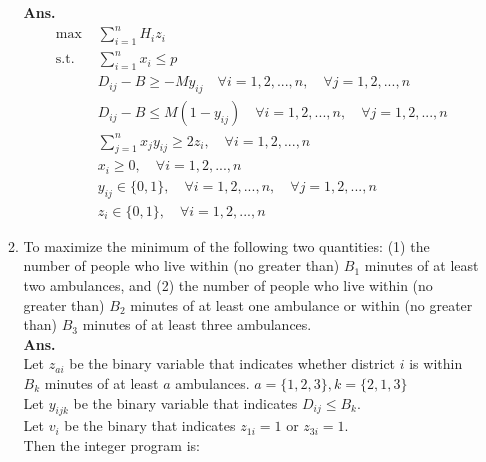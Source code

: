 \documentclass[14pt]{article}
\begin{document}
\begin{enumerate}
\begin{enumerate}
                        \textbf{Ans. }
                        \begin{align*}
                              \text{max }  & \sum_{i=1}^n H_iz_{i}                                                                      \\
                              \text{s.t. } & \sum_{i=1}^n x_i \leq p                                                                    \\
                                           & D_{ij} - B \geq -My_{ij} \quad \forall i = 1, 2, ..., n, \quad \forall j = 1, 2, ..., n    \\
                                           & D_{ij} - B \leq M(1-y_{ij}) \quad \forall i = 1, 2, ..., n, \quad \forall j = 1, 2, ..., n \\
                                           & \sum_{j=1}^n x_jy_{ij} \geq 2z_i, \quad \forall i = 1, 2, ..., n                           \\
                                           & x_i \geq 0, \quad \forall i = 1, 2, ..., n                                                 \\
                                           & y_{ij} \in \{0, 1\}, \quad \forall i = 1, 2, ..., n, \quad \forall j = 1, 2, ..., n        \\
                                           & z_i \in \{0, 1\}, \quad \forall i = 1, 2, ..., n
                        \end{align*}
                  \item To maximize the minimum of the following two quantities: (1) the number of people who live within (no greater than) $B_1$ minutes of at least two ambulances, and (2) the number of people who live within (no greater than) $B_2$ minutes of at least one ambulance or within (no greater than) $B_3$ minutes of at least three ambulances.\\
                        \textbf{Ans. }\\
                        Let $z_{ai}$ be the binary variable that indicates whether district $i$ is within $B_k$ minutes of at least $a$ ambulances. $a = \{1,2,3\}, k = \{2,1,3\}$ \\
                        Let $y_{ijk}$ be the binary variable that indicates $D_{ij} \leq B_k$. \\
                        Let $v_i$ be the binary that indicates $z_{1i} = 1 $ or $z_{3i} = 1$. \\
                        Then the integer program is:

\end{enumerate}
\end{enumerate}
\end{document}
